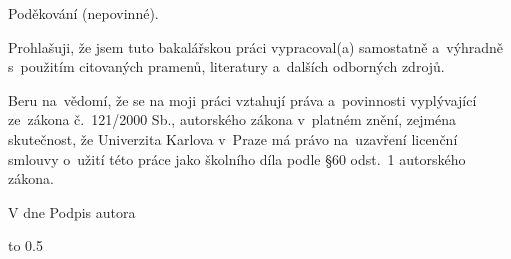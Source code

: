 


\newpage
\openright

\noindent
Poděkování (nepovinné).




\newpage

\noindent
Prohlašuji, že jsem tuto bakalářskou práci vypracoval(a) samostatně a~výhradně
s~použitím citovaných pramenů, literatury a~dalších odborných zdrojů.

\medskip\noindent
Beru na~vědomí, že se na moji práci vztahují práva a~povinnosti vyplývající
ze~zákona č.~121/2000 Sb., autorského zákona v~platném znění, zejména skutečnost,
že Univerzita Karlova v~Praze má právo na~uzavření licenční smlouvy o~užití této
práce jako školního díla podle \S60 odst.~1 autorského zákona.

\vspace{18mm}
\noindent
V \makebox[4cm]{\dotfill} dne \makebox[2.5cm]{\dotfill}
\hspace*{\fill}
Podpis autora
\hspace*{\fill}





\newpage

\vbox to 0.5

